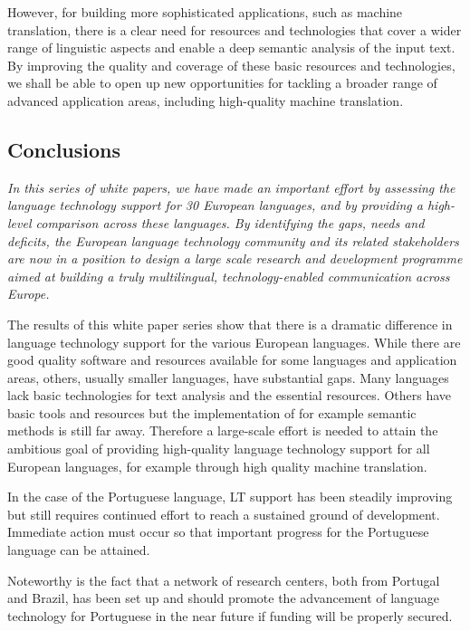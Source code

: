 \documentclass[]{../metanetpaper}
\begin{document}
\begin{multicols}{2}
However, for building more sophisticated applications, such as machine translation, there is a clear need for resources and technologies that cover a wider range of linguistic aspects and enable a deep semantic analysis of the input text. By improving the quality and coverage of these basic resources and technologies, we shall be able to open up new opportunities for tackling a broader range of advanced application areas, including high-quality machine translation.

\subsection{Conclusions}

\emph{In this series of white papers, we have made an important effort by assessing the language technology support for 30 European languages, and by providing a high-level comparison across these languages. By identifying the gaps, needs and deficits, the European language technology community and its related stakeholders are now in a position to design a large scale research and development programme aimed at building a truly multilingual, technology-enabled communication across Europe.}

The results of this white paper series show that there is a dramatic difference in language technology support for the various European languages. While there are good quality software and resources available for some languages and application areas, others, usually smaller languages, have substantial gaps. Many languages lack basic technologies for text analysis and the essential resources. Others have basic tools and resources but the implementation of for example semantic methods is still far away. Therefore a large-scale effort is needed to attain the ambitious goal of providing high-quality language technology support for all European languages, for example through high quality machine translation. 

   In the case of the Portuguese language, LT support has been steadily improving but still requires continued effort to reach a sustained ground of development. Immediate action must occur so that important progress for the Portuguese language can be attained.

  Noteworthy is the fact that a network of research centers, both from Portugal and Brazil, has been set up and should promote the advancement of language technology for Portuguese in the near future if funding will be properly secured.


\end{multicols}
\end{document}
